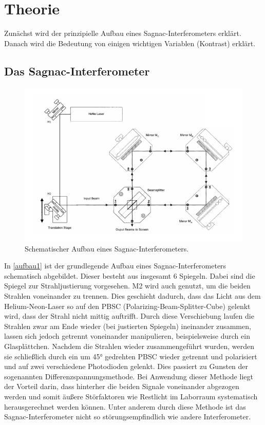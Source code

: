 \section{Theorie}
\label{sec:Theorie}

Zunächst wird der prinzipielle Aufbau eines Sagnac-Interferometers erklärt.
Danach wird die Bedeutung von einigen wichtigen Variablen (Kontrast) erklärt.

\subsection{Das Sagnac-Interferometer} \label{sec:aufbau}

\begin{figure}[h]
    \centering
    \includegraphics[width = 0.7 \linewidth]{pictures/aufbau1.pdf}
    \caption{Schematischer Aufbau eines Sagnac-Interferometers.\cite{v64}}
    \label{aufbau1}
\end{figure}

In \autoref{aufbau1} ist der grundlegende Aufbau eines Sagnac-Interferometers schematisch abgebildet.
Dieser besteht aus insgesamt 6 Spiegeln.
Dabei sind die Spiegel zur Strahljustierung vorgesehen.
M2 wird auch genutzt, um die beiden Strahlen voneinander zu trennen.
Dies geschieht dadurch, dass das Licht aus dem Helium-Neon-Laser so auf den PBSC (Polarizing-Beam-Splitter-Cube) gelenkt wird, dass der Strahl nicht mittig auftrifft.
Durch diese Verschiebung laufen die Strahlen zwar am Ende wieder (bei justierten Spiegeln) ineinander zusammen, lassen sich jedoch getrennt voneinander manipulieren, beispielsweise durch ein Glasplättchen.
Nachdem die Strahlen wieder zusammengeführt wurden, werden sie schließlich durch ein um 45°  gedrehten PBSC wieder getrennt und polarisiert und auf zwei verschiedene Photodioden gelenkt.
Dies passiert zu Gunsten der sogenannten Differenzspannungsmethode.
Bei Anwendung dieser Methode liegt der Vorteil darin, dass hinterher die beiden Signale voneinander abgezogen werden und somit äußere Störfaktoren wie Restlicht im Laborraum systematisch herausgerechnet werden können.
Unter anderem durch diese Methode ist das Sagnac-Interferometer nicht so störungsempfindlich wie andere Interferometer. 


